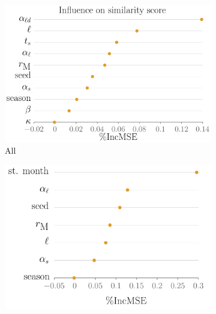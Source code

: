 \documentclass[11pt]{article}
\theoremstyle{definition}
\begin{document}
\begin{figure}[t]
\centering
\begin{subfigure}[b]{.32\textwidth}
    \includegraphics[width=1.1\textwidth]{../cellular_automata/results/rf/rf_importance_all_mse.pdf}
\caption{All\label{fig:rfAll}}
\end{subfigure}\hspace{2mm}
\begin{subfigure}[b]{.32\textwidth}
    \includegraphics[width=1.1\textwidth]{../cellular_automata/results/rf/rf_importance_short_mse.pdf}

\end{subfigure}
\end{figure}
\end{document}
